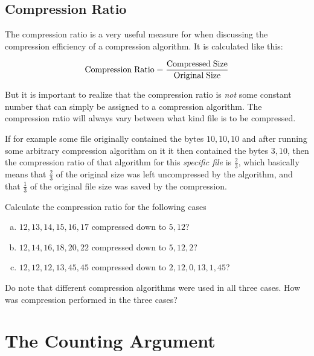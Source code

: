 \subsection{Compression Ratio}

The compression ratio is a very useful
measure for when discussing the compression efficiency of a
compression algorithm. It is calculated like this:

\begin{equation*}
  {\rm Compression\;Ratio} = \frac{{\rm Compressed\; Size}}{{\rm Original\; Size}}
\end{equation*}

But it is important to realize that the compression ratio is
\textit{not} some constant number that can simply be assigned to a
compression algorithm. The compression ratio will always vary between
what kind file is to be compressed.

If for example some file originally contained the bytes $10,10,10$ and
after running some arbitrary compression algorithm on it it then
contained the bytes $3,10$, then the compression ratio of that
algorithm for this \textit{specific file} is $\frac{2}{3}$, which
basically means that $\frac{2}{3}$ of the original size was left
uncompressed by the algorithm, and that $\frac{1}{3}$ of the original
file size was saved by the compression.

\begin{Exercise}[label={compression-ratio}]

  Calculate the compression ratio for the following cases

  \begin{enumerate}[(a)]
  \item $12,13,14,15,16,17$ compressed down to $5,12$?
  \item $12,14,16,18,20,22$ compressed down to $5,12,2$?
  \item $12,12,12,13,45,45$ compressed down to $2,12,0,13,1,45$?
  \end{enumerate}

  Do note that different compression algorithms were used in all three
  cases. How was compression performed in the three cases?

\end{Exercise}

\section{The Counting Argument}

